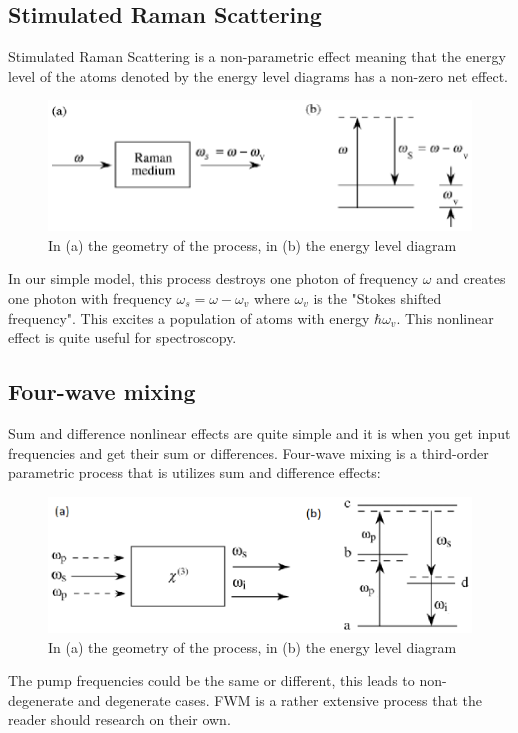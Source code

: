 \documentclass{article}
\begin{document}
\subsection{Stimulated Raman Scattering}
Stimulated Raman Scattering is a non-parametric effect meaning that the energy level of the atoms denoted by the energy level diagrams has a non-zero net effect.

\begin{figure}[!phbt]
    \centering
    \includegraphics[width=0.65\linewidth]{img/SRS.eps}
    \caption{In (a) the geometry of the process, in (b) the energy level diagram}
    \label{fig:srs}
\end{figure}

In our simple model, this process destroys one photon of frequency $\omega$ and creates one photon with frequency $\omega_s = \omega - \omega_v$ where $\omega_v$ is the "Stokes shifted frequency". This excites a population of atoms with energy $\hbar\omega_v$. This nonlinear effect is quite useful for spectroscopy.

\subsection{Four-wave mixing}
Sum and difference nonlinear effects are quite simple and it is when you get input frequencies and get their sum or differences. Four-wave mixing is a third-order parametric process that is utilizes sum and difference effects:

\begin{figure}[!phbt]
    \centering
    \includegraphics[width=0.65\linewidth]{img/fwm.eps}
    \caption{In (a) the geometry of the process, in (b) the energy level diagram}
    \label{fig:fwm}
\end{figure}
The pump frequencies could be the same or different, this leads to non-degenerate and degenerate cases.
FWM is a rather extensive process that the reader should research on their own.
\end{document}
